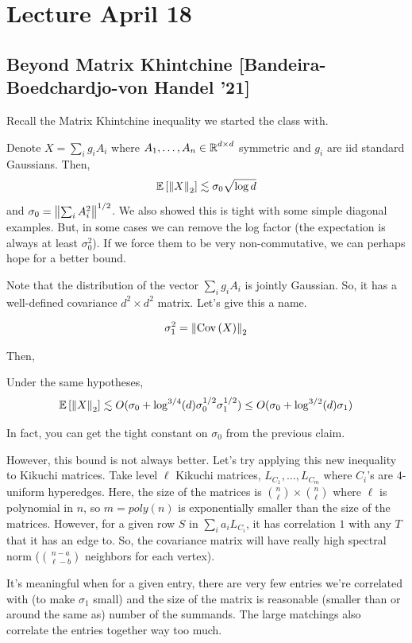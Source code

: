 

\section{Lecture April 18}

\subsection{Beyond Matrix Khintchine [Bandeira-Boedchardjo-von Handel '21]}

Recall the Matrix Khintchine inequality we started the class with.

Denote $X = \sum_i g_i A_i$ where $A_1, \dots, A_n \in \operatorname{\mathbb{R}}^{d\times d}$ symmetric
and $g_i$ are iid standard Gaussians. Then,
\[ \mathbb{E}\left[ \norm{X}_2 \right] \lesssim \sigma_0 \sqrt{\log d} \]
and $\sigma_0 = \norm{\sum_i A_i^2}^{1/2}$. We also showed this is tight
with some simple diagonal examples. But, in some cases
we can remove the log factor (the expectation is always at least $\sigma_0^2$).
If we force them to be very non-commutative, we can perhaps hope for a better bound.

Note that the distribution of the vector $\sum_i g_i A_i$
is jointly Gaussian. So, it has a well-defined covariance $d^2 \times d^2$ matrix. Let's give this a name.
\begin{definition}
    \[ \sigma_1^2 = \norm{\text{Cov}\left( X \right)}_2 \]
\end{definition}
Then, 
\begin{theorem}[BBvH'21]
    Under the same hypotheses,
    \[ \mathbb{E}\left[ \norm{X}_2 \right] \lesssim O(\sigma_0 + \log^{3/4}(d) \sigma_0^{1/2} \sigma_1^{1/2}) \le O(\sigma_0 + \log^{3/2}(d) \sigma_1) \]
\end{theorem}
In fact, you can get the tight constant on $\sigma_0$ from the previous claim.

However, this bound is not always better. Let's try applying this new inequality
to Kikuchi matrices. Take level $\ell$ Kikuchi matrices, $L_{C_1}, \dots, L_{C_m}$
where $C_i$'s are $4$-uniform hyperedges. Here, the size of the matrices is $\binom{n}{\ell} \times \binom{n}{\ell}$
where $\ell$ is polynomial in $n$, so $m = poly(n)$ is exponentially smaller than the size of the matrices.
However, for a given row $S$ in $\sum_i a_i L_{C_i}$, it has correlation $1$ with any $T$ that it has an edge to.
So, the covariance matrix will have really high spectral norm ($\binom{n - a}{\ell - b}$ neighbors for each vertex).

It's meaningful when for a given entry, there are very few entries we're correlated with (to make $\sigma_1$ small)
and the size of the matrix is reasonable (smaller than or around the same as) number of the summands. The large matchings
also correlate the entries together way too much.

